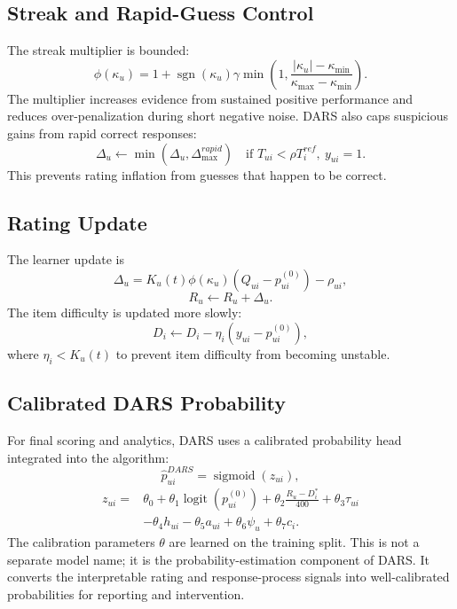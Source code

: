 \documentclass[conference]{IEEEtran}
\newcommand{\sigmoid}{\operatorname{sigmoid}}
\newcommand{\logit}{\operatorname{logit}}
\begin{document}
\subsection{Streak and Rapid-Guess Control}
The streak multiplier is bounded:
\begin{equation}
\phi(\kappa_u)=1+\operatorname{sgn}(\kappa_u)\gamma
\min\left(1,\frac{|\kappa_u|-\kappa_{\min}}{\kappa_{\max}-\kappa_{\min}}\right).
\end{equation}
The multiplier increases evidence from sustained positive performance and reduces over-penalization during short negative noise. DARS also caps suspicious gains from rapid correct responses:
\begin{equation}
\Delta_u \leftarrow \min(\Delta_u,\Delta_{\max}^{rapid})
\quad \text{if } T_{ui}<\rho T_i^{ref},\ y_{ui}=1.
\end{equation}
This prevents rating inflation from guesses that happen to be correct.

\subsection{Rating Update}
The learner update is
\begin{equation}
\Delta_u=K_u(t)\phi(\kappa_u)\left(Q_{ui}-p^{(0)}_{ui}\right)-\rho_{ui},
\end{equation}
\begin{equation}
R_u \leftarrow R_u+\Delta_u.
\end{equation}
The item difficulty is updated more slowly:
\begin{equation}
D_i \leftarrow D_i-\eta_i(y_{ui}-p^{(0)}_{ui}),
\end{equation}
where $\eta_i<K_u(t)$ to prevent item difficulty from becoming unstable.

\subsection{Calibrated DARS Probability}
For final scoring and analytics, DARS uses a calibrated probability head integrated into the algorithm:
\begin{equation}
\hat{p}^{DARS}_{ui}=\sigmoid(z_{ui}),
\end{equation}
\begin{align}
z_{ui}=&\theta_0+\theta_1\logit(p^{(0)}_{ui})
+\theta_2\frac{R_u-D_i^\ast}{400}
+\theta_3\tau_{ui} \nonumber\\
&-\theta_4 h_{ui}-\theta_5 a_{ui}
+\theta_6\psi_u+\theta_7 c_i.
\end{align}
The calibration parameters $\theta$ are learned on the training split. This is not a separate model name; it is the probability-estimation component of DARS. It converts the interpretable rating and response-process signals into well-calibrated probabilities for reporting and intervention.
\end{document}
